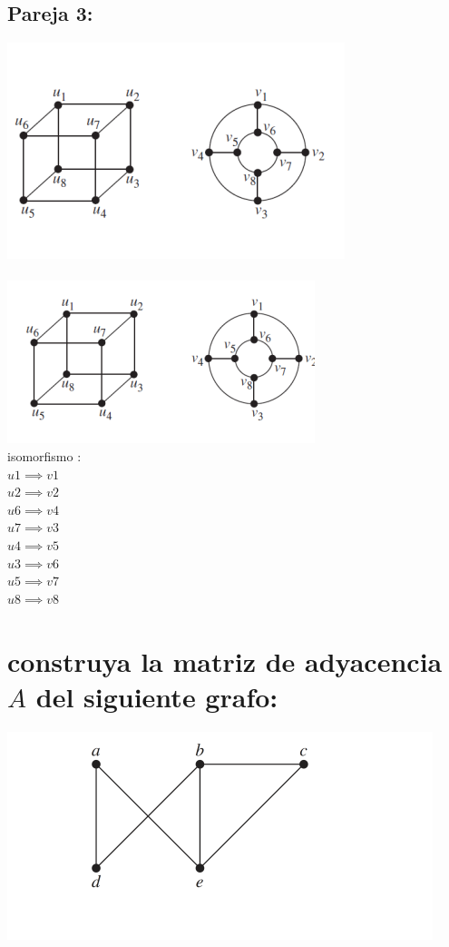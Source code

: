 \documentclass[10pt,a4paper]{article} %
\begin{document}
        \subsection{Pareja 3:}
            \includegraphics[width=0.8\linewidth]{pareja3.png}
            \\
            \\\includegraphics[width=0.8\linewidth]{grafotres.png}
            \\
            isomorfismo : \\
            $ u1 \implies v1  $
            \\ $ u2 \implies v2  $
            \\ $ u6 \implies v4  $
            \\ $ u7 \implies v3  $
            \\ $ u4 \implies v5  $
            \\ $ u3 \implies v6  $
            \\ $ u5 \implies v7  $
            \\ $ u8 \implies v8  $

    \section{construya la matriz de adyacencia $ A  $ del siguiente grafo:}
        \includegraphics[width=0.8\linewidth]{grafoadj.png}
        \\
\end{document}
